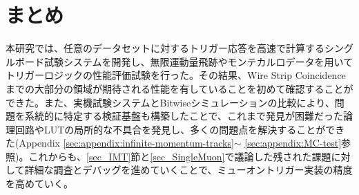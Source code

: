 \section{まとめ}
本研究では、任意のデータセットに対するトリガー応答を高速で計算するシングルボード試験システムを開発し、無限運動量飛跡やモンテカルロデータを用いてトリガーロジックの性能評価試験を行った。その結果、Wire Strip Coincidenceまでの大部分の領域が期待される性能を有していることを初めて確認することができた。また、実機試験システムとBitwiseシミュレーションの比較により、問題を系統的に特定する検証基盤も構築したことで、これまで発見が困難だった論理回路やLUTの局所的な不具合を発見し、多くの問題点を解決することができた(Appendix \ref{sec:appendix:infinite-momentum-tracks}$\sim$ \ref{sec:appendix:MC-test}参照)。これからも、\ref{sec_IMT}節と\ref{sec_SingleMuon}で議論した残された課題に対して詳細な調査とデバッグを進めていくことで、ミューオントリガー実装の精度を高めていく。



